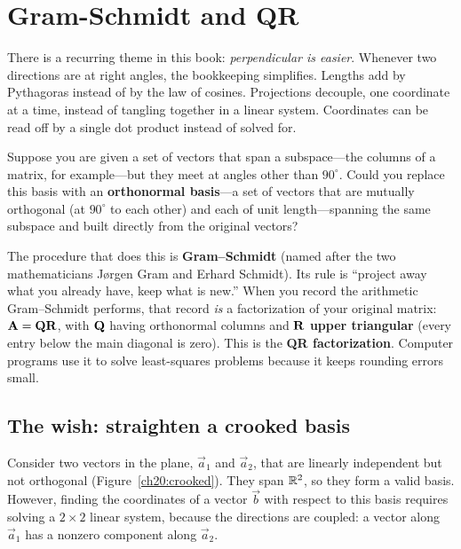 \chapter{Gram-Schmidt and QR}

There is a recurring theme in this book: \emph{perpendicular is easier}. Whenever
two directions are at right angles, the bookkeeping simplifies. Lengths add by
Pythagoras instead of by the law of cosines. Projections decouple, one coordinate
at a time, instead of tangling together in a linear system. Coordinates can be read
off by a single dot product instead of solved for.

Suppose you are given a set of vectors that span a subspace---the columns of a matrix,
for example---but they meet at angles other than $90^\circ$.
Could you replace this basis with an \textbf{orthonormal basis}---a set of vectors
that are mutually orthogonal (at $90^\circ$ to each other) and each of unit length---spanning
the same subspace and built directly from the original vectors?

The procedure that does this is \textbf{Gram--Schmidt} (named after the two
mathematicians J\o rgen Gram and Erhard Schmidt). Its rule is
``project away what you already have, keep what is new.'' When you record the
arithmetic Gram--Schmidt performs, that record \emph{is} a factorization of your
original matrix: $\mathbf{A} = \mathbf{Q}\mathbf{R}$, with $\mathbf{Q}$ having orthonormal
columns and $\mathbf{R}$ \textbf{upper triangular} (every entry below the main
diagonal is zero). This is the \textbf{QR factorization}. Computer programs use it
to solve least-squares problems because it keeps rounding errors small.

\section{The wish: straighten a crooked basis}

Consider two vectors in the plane, $\vec{a}_1$ and $\vec{a}_2$, that are linearly independent
but not orthogonal (Figure~\ref{ch20:crooked}). They span $\mathbb{R}^2$, so they form a valid
basis. However, finding the coordinates of a vector $\vec{b}$ with respect to this basis
requires solving a $2\times 2$ linear system, because the directions are coupled: a
vector along $\vec{a}_1$ has a nonzero component along $\vec{a}_2$.

